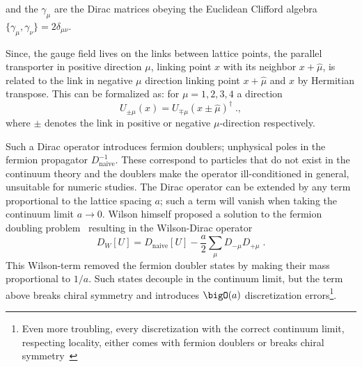 and the $\gamma_{\mu}$ are the Dirac matrices obeying the Euclidean Clifford algebra $\{\gamma_{\mu}, \gamma_{\nu}\} = 2 \delta_{\mu \nu}$.

Since, the gauge field lives on the links between lattice points, the parallel transporter in positive direction $\mu$, linking point $x$ with its neighbor $x + \hat{\mu}$, is related to the link in negative $\mu$ direction linking point $x + \hat{\mu}$ and $x$ by Hermitian transpose.
This can be formalized as: for $\mu=1,2,3,4$ a direction
\begin{equation}
U_{\pm \mu}(x) = U_{\mp \mu}(x \pm \hat{\mu})^{\dagger} \;.,
\end{equation}
where $\pm$ denotes the link in positive or negative $\mu$-direction respectively.

Such a Dirac operator introduces fermion doublers; unphysical poles in the fermion propagator $D_{\text{naive}}^{-1}$.
These correspond to particles that do not exist in the continuum theory and the doublers make the operator ill-conditioned in general, unsuitable for numeric studies.
The Dirac operator can be extended by any term proportional to the lattice spacing $a$; such a term will vanish when taking the continuum limit $a \to 0$.
Wilson himself proposed a solution to the fermion doubling problem~\cite{PhysRevD.25.2649} resulting in the Wilson-Dirac operator
\begin{equation} \label{eq:dirac:wilson:clover}
D_W[U] = D_{\text{naive}}[U] - \frac{a}{2} \sum_{\mu} D_{-\mu} D_{+\mu} \;.
\end{equation}
This Wilson-term removed the fermion doubler states by making their mass proportional to $1/a$.
Such states decouple in the continuum limit, but the term above breaks chiral symmetry and introduces $\bigO(a)$ discretization errors\footnote{Even more troubling, every discretization with the correct continuum limit, respecting locality, either comes with fermion doublers or breaks chiral symmetry~\cite{Nielsen:1980rz,Nielsen:1981xu}}.

